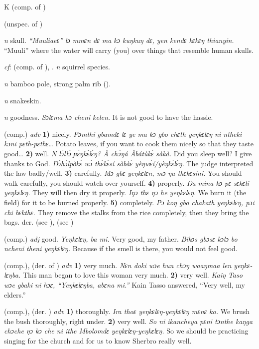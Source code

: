 \begin{letter}{K}
 (comp. of ) 

 (unspec. of ) 

 \textit{n} skull. \textit{“Muuliaeɛ” lɔ mmɛn dɛ ma kɔ kuŋkuŋ dɛ, yen kendɛ kɛkɛŋ thianyin.} “Muuli” where the water will carry (you) over things that resemble human skulls.

 \textit{cf}:  (comp. of ), . \textit{n} squirrel species.

 \textit{n} bamboo pole, strong palm rib (\citealt{Pichl1967}). 

 \textit{n} snakeskin.

 \textit{n} goodness. \textit{Sɔlɛma hɔ cheni kelen.} It is not good to have the hassle. 

 (comp.) \textit{adv} \textbf{1)} nicely. \textit{Pɔmthi gbamdɛ lɛ ye ma kɔ gbo chɛth yeŋkɛlɛŋ ni ntheki kɔni pɛth-pɛthɛ…} Potato leaves, if you want to cook them nicely so that they taste good… \textbf{2)} well. \textit{N lɔ̀llɔ́ ɲɛ̀ŋkɛ̀lɛ́ŋ? À chɔ̀ŋá Àbátùkɛ́ sàkà.} Did you sleep well? I give thanks to God. \textit{Ŋɔ́hɔ́lpòkɛ̀ wɔ̀ thɛ́kɛ́sí sàbàɛ́ yèŋwɛ̀í/yèŋkɛ̀lɛ́ŋ.} The judge interpreted the law badly/well. \textbf{3)} carefully. \textit{Mɔ gbɛ yeŋkɛlɛn, mɔ ŋa thɛkɛsini.} You should walk carefully, you should watch over yourself. \textbf{4)} properly. \textit{Ŋa mina kɔ pɛ sɛkɛli yeŋkɛlɛŋ.} They will then dry it properly. \textit{Iŋɔ thɛ ŋɔ he yeŋkɛlɛŋ.} We burn it (the field) for it to be burned properly. \textbf{5)} completely. \textit{Pɔ koŋ gbo chakath yeŋkɛlɛŋ, pɔi chi bɛkthɛ.} They remove the stalks from the rice completely, then they bring the bags. der.  (see ),  (see )

 (comp.) \textit{adj} good. \textit{Yeŋkɛlɛŋ, ba mi.} Very good, my father. \textit{Bikɔs gbɔsɛ kɔlɔ bo ncheni theni yeŋkɛlɛŋ.} Because if the smell is there, you would not feel good.

 (comp.), (der. of ) \textit{adv} \textbf{1)} very much. \textit{Nɛn doki wɔe hun chɔŋ waaŋmaa len yeŋkɛ-lɛŋba.} This man began to love this woman very much. \textbf{2)} very well. \textit{Kaiŋ Taso wɔe gbaki ni hɔɛ, “Yeŋkɛlɛŋba, abɛna mi.”} Kain Tasso answered, “Very well, my elders.”

 (comp.), (der. ) \textit{adv} \textbf{1)} thoroughly. \textit{Ira thoɛ yeŋkɛlɛŋ-yeŋkɛlɛŋ mɛnɛ ko.} We brush the bush thoroughly, right under. \textbf{2)} very well. \textit{So ni ikancheya pɛni tɔnthe kaŋga chɔche ŋɔ kɔ che ni ithe Mbolomdɛ yeŋkɛlɛŋ-yeŋkɛlɛŋ.} So we should be practicing singing for the church and for us to know Sherbro really well.


\end{letter}
